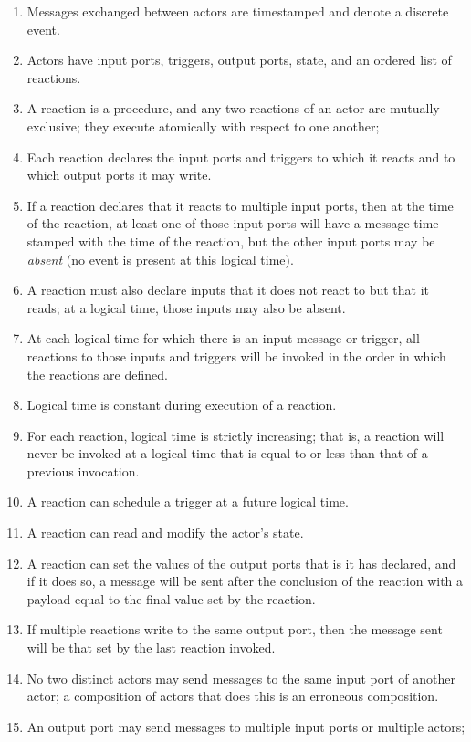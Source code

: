 \documentclass[sigconf]{acmart}
\begin{document}
\begin{enumerate}
\item Messages exchanged between actors are timestamped and denote a discrete event.
\item Actors have input ports, triggers, output ports, state, and an ordered list of reactions.
\item A reaction is a procedure, and any two reactions of an actor are mutually exclusive; they execute atomically with respect to one another;
\item Each reaction declares the input ports and triggers to which it reacts and to which output ports it may write.
\item If a reaction declares that it reacts to multiple input ports, then at the time of the reaction, at least one of those
input ports will have a message time-stamped with the time of the reaction, but the other input ports may be \emph{absent}
(no event is present at this logical time).
\item A reaction must also declare inputs that it does not react to but that it reads;
at a logical time, those inputs may also be absent.
\item At each logical time for which there is an input message or trigger, all reactions to those inputs and triggers will be invoked in the order in which the reactions are defined.
\item Logical time is constant during execution of a reaction.
\item For each reaction, logical time is strictly increasing; that is, a reaction will never be invoked at a logical time that is equal to or less than that of a previous invocation.
\item A reaction can schedule a trigger at a future logical time.
\item A reaction can read and modify the actor's state.
\item A reaction can set the values of the output ports that is it has declared, and if it does so, a message will be sent after the conclusion
of the reaction with a payload equal to the final value set by the reaction.
\item If multiple reactions write to the same output port, then the message sent will be that set by the last reaction invoked.
\item No two distinct actors may send messages to the same input port of another actor;
a composition of actors that does this is an erroneous composition.
\item An output port may send messages to multiple input ports or multiple actors;

\end{enumerate}
\end{document}
